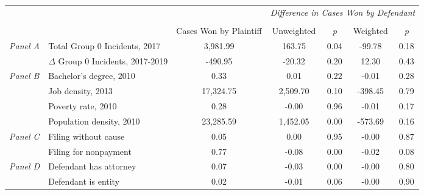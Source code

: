 \begin{tabular}{llccccc}
\toprule
 &  & \textit{} & \multicolumn{4}{c}{\textit{Difference in Cases Won by Defendant}} \\
\cline{4-7}
\\
 &  & Cases Won by Plaintiff & Unweighted & \emph{p} & Weighted & \emph{p} \\
\midrule
\multirow[c]{2}{3cm}{\textit{Panel A}} & Total Group 0 Incidents, 2017 & 3,981.99 & 163.75 & 0.04 & -99.78 & 0.18 \\
 & $\Delta$ Group 0 Incidents, 2017-2019 & -490.95 & -20.32 & 0.20 & 12.30 & 0.43 \\
\cline{1-7}
\multirow[c]{4}{3cm}{\textit{Panel B}} & Bachelor's degree, 2010 & 0.33 & 0.01 & 0.22 & -0.01 & 0.28 \\
 & Job density, 2013 & 17,324.75 & 2,509.70 & 0.10 & -398.45 & 0.79 \\
 & Poverty rate, 2010 & 0.28 & -0.00 & 0.96 & -0.01 & 0.17 \\
 & Population density, 2010 & 23,285.59 & 1,452.05 & 0.00 & -573.69 & 0.16 \\
\cline{1-7}
\multirow[c]{2}{3cm}{\textit{Panel C}} & Filing without cause & 0.05 & 0.00 & 0.95 & -0.00 & 0.87 \\
 & Filing for nonpayment & 0.77 & -0.08 & 0.00 & -0.02 & 0.08 \\
\cline{1-7}
\multirow[c]{2}{3cm}{\textit{Panel D}} & Defendant has attorney & 0.07 & -0.03 & 0.00 & -0.00 & 0.80 \\
 & Defendant is entity & 0.02 & -0.01 & 0.06 & -0.00 & 0.90 \\
\cline{1-7}
\bottomrule
\end{tabular}
